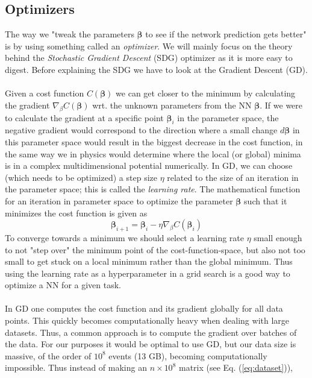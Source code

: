 \documentclass[12pt, a4paper]{book}
\begin{document}
\subsection{Optimizers}\label{sec:SGD}
The way we "tweak the parameters $\bm \beta $ to see if the network prediction gets better" is by using something called an \textit{optimizer}. We will mainly focus on the theory behind the \textit{Stochastic Gradient Descent} (SDG) optimizer as it is more easy to digest. Before explaining the SDG we have to look at the Gradient Descent (GD). \\
\\Given a cost function $C(\bm{\beta})$ we can get closer to the minimum by calculating the gradient $\nabla_{\beta}C(\bm{\beta})$ wrt. the unknown parameters from the NN $\bm\beta$. If we were to calculate the gradient at a specific 
point $\bm{\beta}_i$ in the parameter space, the negative gradient would correspond to the direction where a small change $d\bm\beta$ in this parameter space would result in the biggest decrease in the cost function, in the same way we in physics would determine where the local (or global) minima is in a complex multidimensional potential numerically. In GD, we can choose (which needs to be optimized) a step size $\eta$ related to the size of an iteration in the parameter space; 
this is called the \textit{learning rate}. The mathematical function for an iteration in parameter space to optimize the parameter $\bm{\beta}$ such that it minimizes the cost function is given as
\begin{equation}\label{eq:GD}
    \bm{\beta}_{i+1}=\bm{\beta}_{i} -\eta\nabla_{\beta}C(\bm{\beta}_i)
\end{equation}
To converge towards a minimum we should select a learning rate $\eta$ small enough to not "step over" the minimum point of the cost-function-space, but also not too small to get stuck on a local minimum rather than the global minimum. 
Thus using the learning rate as a hyperparameter in a grid search is a good way to optimize a NN for a given task.\\
\\In GD one computes the cost function and its gradient globally for all data points. This quickly becomes computationally heavy when dealing with large datasets. Thus, a common approach is to compute the gradient over batches of the data. 
For our purposes it would be optimal to use GD, but our data size is massive, of the order of $10^{8}$ events (13 GB), becoming computationally impossible. Thus instead of making an $n\times10^8$ matrix (see Eq. (\ref{eq:dataset})), 
\end{document}
